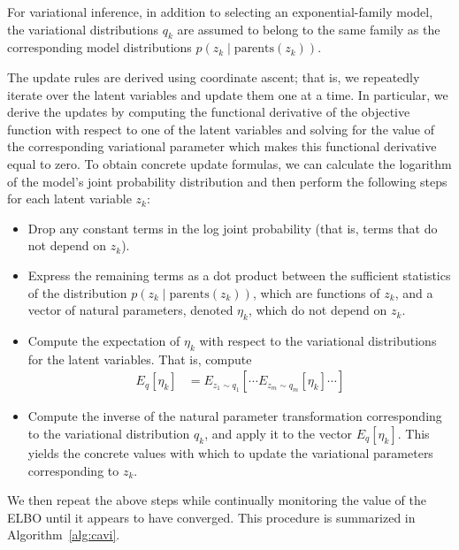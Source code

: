 \documentclass{article}
\begin{document}
For variational inference, in addition to selecting an exponential-family model, the variational distributions $q_k$ are assumed to belong to the same family as the corresponding model distributions $p(z_k \mid \text{parents}(z_k))$.

The update rules are derived using coordinate ascent; that is, we repeatedly iterate over the latent variables and update them one at a time.
In particular, we derive the updates by computing the functional derivative of the objective function with respect to one of the latent variables and solving for the value of the corresponding variational parameter which makes this functional derivative equal to zero.
To obtain concrete update formulas, we can calculate the logarithm of the model's joint probability distribution and then perform the following steps for each latent variable $z_k$:
\begin{itemize}
\item Drop any constant terms in the log joint probability (that is, terms that do not depend on $z_k$).
\item Express the remaining terms as a dot product between the sufficient statistics of the distribution $p(z_k \mid \text{parents}(z_k))$, which are functions of $z_k$, and a vector of natural parameters, denoted $\eta_k$, which do not depend on $z_k$.
\item Compute the expectation of $\eta_k$ with respect to the variational distributions for the latent variables.
That is, compute
\begin{align}
E_q[\eta_k] &= E_{z_1 \sim q_1} \left[ \cdots E_{z_m \sim q_m} \left[ \eta_k \right] \cdots \right]
\end{align}
\item Compute the inverse of the natural parameter transformation corresponding to the variational distribution $q_k$, and apply it to the vector $E_q[\eta_k]$.
This yields the concrete values with which to update the variational parameters corresponding to $z_k$.
\end{itemize}
We then repeat the above steps while continually monitoring the value of the ELBO until it appears to have converged.
This procedure is summarized in Algorithm~\ref{alg:cavi}.
\end{document}
